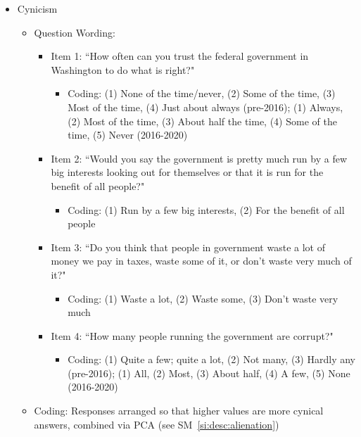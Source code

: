 \begin{itemize}
	\item Cynicism
	\begin{itemize}
		\item Question Wording:
		\begin{itemize} 
			\item Item 1: ``How often can you trust the federal government in Washington to do what is right?"
			\begin{itemize}
				\item Coding: (1) None of the time/never, (2) Some of the time, (3) Most of the time, (4) Just about always (pre-2016); (1) Always, (2) Most of the time, (3) About half the time, (4) Some of the time, (5) Never (2016-2020)
			\end{itemize}
			\item Item 2: ``Would you say the government is pretty much run by a few big interests looking out for themselves or that it is run for the benefit of all people?"
			\begin{itemize}
				\item Coding: (1) Run by a few big interests, (2) For the benefit of all people
			\end{itemize}
			\item Item 3: ``Do you think that people in government waste a lot of money we pay in taxes, waste some of it, or don't waste very much of it?"
			\begin{itemize}
				\item Coding: (1) Waste a lot, (2) Waste some, (3) Don't waste very much
			\end{itemize}
			\item Item 4: ``How many people running the government are corrupt?"
			\begin{itemize}
				\item Coding: (1) Quite a few; quite a lot, (2) Not many, (3) Hardly any (pre-2016); (1) All, (2) Most, (3) About half, (4) A few, (5) None (2016-2020)
			\end{itemize}
		\end{itemize}
		\item Coding: Responses arranged so that higher values are more cynical answers, combined via PCA (see SM~\ref{si:desc:alienation})
	\end{itemize}
		

\end{itemize}
